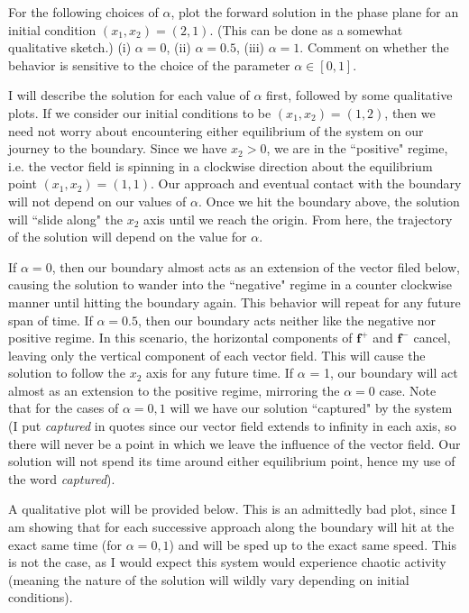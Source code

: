 For the following choices of $\alpha$, plot the forward solution in the phase plane for an initial condition $(x_1, x_2) = (2, 1)$. (This can be done as a somewhat qualitative sketch.) (i) $\alpha = 0$, (ii) $\alpha = 0.5$, (iii) $\alpha = 1$. Comment on whether the behavior is sensitive to the choice of the parameter $\alpha \in [0, 1]$.


\partbreak

\begin{solution}

    I will describe the solution for each value of $\alpha$ first, followed by some qualitative plots. If we consider our initial conditions to be $(x_1, x_2) = (1, 2)$, then we need not worry about encountering either equilibrium of the system on our journey to the boundary. Since we have $x_2 > 0$, we are in the ``positive" regime, i.e. the vector field is spinning in a clockwise direction about the equilibrium point $(x_1, x_2) = (1, 1)$. Our approach and eventual contact with the boundary will not depend on our values of $\alpha$. Once we hit the boundary above, the solution will ``slide along" the $x_2$ axis until we reach the origin. From here, the trajectory of the solution will depend on the value for $\alpha$.

    \jump
    If $\alpha = 0$, then our boundary almost acts as an extension of the vector filed below, causing the solution to wander into the ``negative" regime in a counter clockwise manner until hitting the boundary again. This behavior will repeat for any future span of time. If $\alpha = 0.5$, then our boundary acts neither like the negative nor positive regime. In this scenario, the horizontal components of $\textbf{f}^+$ and $\textbf{f}^-$ cancel, leaving only the vertical component of each vector field. This will cause the solution to follow the $x_2$ axis for any future time. If $\alpha$ = 1, our boundary will act almost as an extension to the positive regime, mirroring the $\alpha = 0$ case. Note that for the cases of $\alpha = 0, 1$ will we have our solution ``captured" by the system (I put \textit{captured} in quotes since our vector field extends to infinity in each axis, so there will never be a point in which we leave the influence of the vector field. Our solution will not spend its time around either equilibrium point, hence my use of the word \textit{captured}). 
    
    \jump
    A qualitative plot will be provided below. This is an admittedly bad plot, since I am showing that for each successive approach along the boundary will hit at the exact same time (for $\alpha = 0, 1$) and will be sped up to the exact same speed. This is not the case, as I would expect this system would experience chaotic activity (meaning the nature of the solution will wildly vary depending on initial conditions).
\end{solution}

